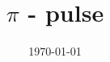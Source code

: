 \documentclass[12pt,a4paper]{article}
\begin{document}
\title{$\pi$ - pulse}
\author{}
\date{\today}
\maketitle

\clearpage


\end{document}
